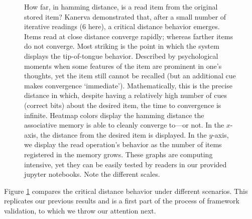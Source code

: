 \begin{figure}[h!]
\centering


\caption{How far, in hamming distance, is a read item from the original stored item? Kanerva demonstrated that, after a small number of iterative readings (6 here), a critical distance behavior emerges. Items read at close distance converge rapidly; whereas farther items do not converge. Most striking is the point in which the system displays the tip-of-tongue behavior. Described by psychological moments when some features of the item are prominent in one's thoughts, yet the item still cannot be recalled (but an additional cue makes convergence `immediate'). Mathematically, this is the precise distance in which, despite having a relatively high number of cues (correct bits) about the desired item, the time to convergence is infinite.   Heatmap colors display the hamming distance the associative memory is able to cleanly converge to---or not.   In the $x$-axis, the distance from the desired item is displayed. In the $y$-axis, we display the read operation's behavior as the number of items registered in the memory grows.  These graphs are computing intensive, yet they can be easily tested by readers in our provided jupyter notebooks. Note the different scales.}
\label{fig:crit-dist-10k-writes}

\end{figure}

Figure \ref{fig:crit-dist-10k-writes} compares the critical distance behavior under different scenarios.  This replicates our previous results and is a first part of the process of framework validation, to which we throw our attention next.
